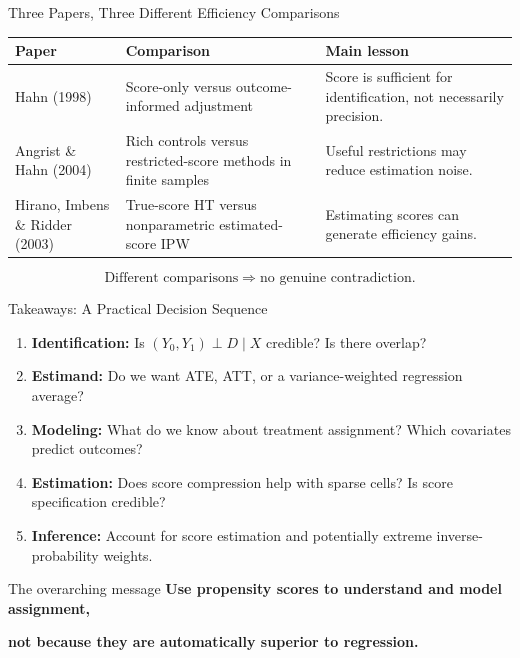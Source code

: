 \documentclass[aspectratio=169,11pt]{beamer}
\begin{document}
\begin{frame}{Three Papers, Three Different Efficiency Comparisons}
\small
\begin{tabular}{p{}p{}p{}}
\toprule
\textbf{Paper} & \textbf{Comparison} & \textbf{Main lesson}\\
\midrule
Hahn (1998) & Score-only versus outcome-informed adjustment & Score is sufficient for identification, not necessarily precision.\\[0.75em]
Angrist \& Hahn (2004) & Rich controls versus restricted-score methods in finite samples & Useful restrictions may reduce estimation noise.\\[0.75em]
Hirano, Imbens \& Ridder (2003) & True-score HT versus nonparametric estimated-score IPW & Estimating scores can generate efficiency gains.\\
\bottomrule
\end{tabular}
\medskip
\[
\boxed{\text{Different comparisons}\;\Longrightarrow\;\text{no genuine contradiction.}}
\]
\end{frame}

\begin{frame}{Takeaways: A Practical Decision Sequence}
\small
\begin{enumerate}
\item \textbf{Identification:} Is \((Y_0,Y_1)\perp D\mid X\) credible? Is there overlap?
\item \textbf{Estimand:} Do we want ATE, ATT, or a variance-weighted regression average?
\item \textbf{Modeling:} What do we know about treatment assignment? Which covariates predict outcomes?
\item \textbf{Estimation:} Does score compression help with sparse cells? Is score specification credible?
\item \textbf{Inference:} Account for score estimation and potentially extreme inverse-probability weights.
\end{enumerate}
\medskip
\begin{block}{The overarching message}
\centering
\textbf{Use propensity scores to understand and model assignment,}\par
\textbf{not because they are automatically superior to regression.}
\end{block}
\end{frame}
\end{document}
